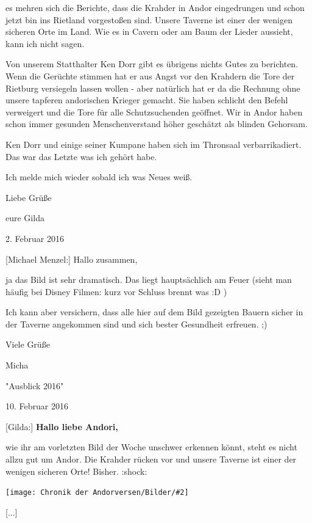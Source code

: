 \documentclass[10pt, a4paper, oneside]{book}
\newcommand{\bildmitts}[2][height=0.32\textwidth,width=0.48\textwidth,keepaspectratio]{%
    \begin{center}
        \texttt{[image: Chronik der Andorversen/Bilder/\#2]}
    \end{center}
}
\begin{document}
\begin{multicols}{2}
es mehren sich die Berichte, dass die Krahder in Andor eingedrungen und schon jetzt bin ins Rietland vorgestoßen sind. Unsere Taverne ist einer der wenigen sicheren Orte im Land. Wie es in Cavern oder am Baum der Lieder aussieht, kann ich nicht sagen.

Von unserem Statthalter Ken Dorr gibt es übrigens nichts Gutes zu berichten. Wenn die Gerüchte stimmen hat er aus Angst vor den Krahdern die Tore der Rietburg versiegeln lassen wollen - aber natürlich hat er da die Rechnung ohne unsere tapferen andorischen Krieger gemacht. Sie haben schlicht den Befehl verweigert und die Tore für alle Schutzsuchenden geöffnet. Wir in Andor haben schon immer gesunden Menschenverstand höher geschätzt als blinden Gehorsam.

Ken Dorr und einige seiner Kumpane haben sich im Thronsaal verbarrikadiert. Das war das Letzte was ich gehört habe.

Ich melde mich wieder sobald ich was Neues weiß.



Liebe Grüße

eure Gilda

\begin{center}
    2. Februar 2016
\end{center}

[Michael Menzel:] Hallo zusammen,

ja das Bild ist sehr dramatisch. Das liegt hauptsächlich am Feuer (sieht man häufig bei Disney Filmen: kurz vor Schluss brennt was :D )

Ich kann aber versichern, dass alle hier auf dem Bild gezeigten Bauern sicher in der Taverne angekommen sind und sich bester Gesundheit erfreuen. ;)


Viele Grüße

Micha



\begin{center}
    "Ausblick 2016"

    10. Februar 2016
\end{center}


[Gilda:] \textbf{Hallo liebe Andori,}

wie ihr am vorletzten Bild der Woche unschwer erkennen könnt, steht es nicht allzu gut um Andor. Die Krahder rücken vor und unsere Taverne ist einer der wenigen sicheren Orte! Bisher. :shock:

\bildmitts{AA2016 Ausblick 1.jpeg}

[...]


\end{multicols}
\end{document}
